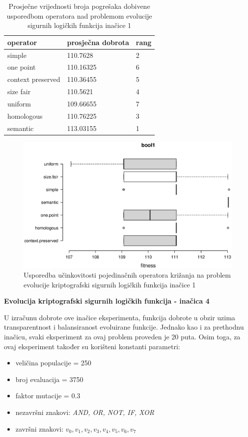 \begin{table}[H]
 	\centering

    \begin{tabular}{| l | l | l |}
    \hline
    \textbf{operator} & \textbf{prosječna dobrota} & \textbf{rang}\\ \hline
    simple & 110.7628 & 2\\ \hline
    one point & 110.16325 & 6\\ \hline
    context preserved & 110.36455 & 5\\ \hline
    size fair & 110.5621 & 4\\ \hline
    uniform & 109.66655 & 7\\ \hline
    homologous & 110.76225 & 3\\ \hline
    semantic & 113.03155 & 1\\ \hline
    \end{tabular}
    
    \caption{Prosječne vrijednosti broja pogrešaka dobivene usporedbom operatora nad problemom evolucije sigurnih logičkih funkcija inačice 1}
    \label{bool1table}
\end{table}

\begin{figure}[H]
	\centering
	\includegraphics[trim=0cm 4cm 0cm 0cm, scale=0.5]{./slike/boxPlots/bool1.eps}
	\caption{Usporedba učinkovitosti pojedinačnih operatora križanja na problem evolucije kriptografski sigurnih logičkih funkcija inačice 1}
	\label{bool1box}
\end{figure}


\textbf{Evolucija kriptografski sigurnih logičkih funkcija - inačica 4}

U izračunu dobrote ove inačice eksperimenta, funkcija dobrote u obzir uzima transparentnost i balansiranost evoluirane funkcije. Jednako kao i za prethodnu inačicu, svaki eksperiment za ovaj problem proveden je 20 puta. Osim toga, za  ovaj eksperiment također su korišteni konstanti parametri:
\begin{itemize}
\item{veličina populacije = 250}
\item{broj evaluacija = 3750}
\item{faktor mutacije = 0.3}
\item{nezavršni znakovi: \textit{AND, OR, NOT, IF, XOR}}
\item{završni znakovi: \textit{$v_0, v_1, v_2, v_3, v_4, v_5, v_6, v_7$}}
\end{itemize}

